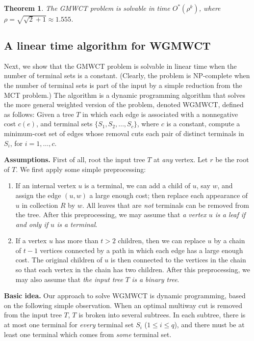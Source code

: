 \documentclass[11pt]{article}
\newtheorem{theorem}{Theorem}[section]
\begin{document}
\begin{theorem}
\label{thm:gmwct}
The GMWCT problem is solvable in time $O^{*}(\rho^k)$, where $\rho = \sqrt{\sqrt{2} + 1} \approx 1.555$.
\end{theorem}




\subsection{A linear time algorithm for WGMWCT}
\label{subsec:wgmwc}
Next, we show that the GMWCT problem is solvable in linear time when the number of terminal sets is a constant. (Clearly, the problem is NP-complete when the number of terminal sets is part of the input by a simple reduction from the MCT problem.) The algorithm is a dynamic programming algorithm that solves the more general weighted version of the problem, denoted WGMWCT, defined as follows: Given a tree $T$ in which each edge is associated with a nonnegative cost $c(e)$, and terminal sets $\{S_1, S_2, \dots, S_c\}$, where $c$ is a constant, compute a minimum-cost set of edges
whose removal cuts each pair of distinct terminals in $S_i$, for $i=1, \ldots, c$.

{\bf Assumptions.}
First of all, root the input tree $T$ at {\em any} vertex.
Let $r$ be the root of $T$. We first apply some simple preprocessing:
\begin{enumerate}
\item If an internal vertex $u$ is a terminal, we can add a child of $u$, say $w$, and assign the edge $(u, w)$ a large enough cost; then replace each appearance of $u$ in collection $R$ by $w$.
All leaves that are {\em not} terminals can be removed from the tree. After this preprocessing, we may assume that {\em a vertex $u$ is a leaf if and
only if $u$ is a terminal}.

\item If a vertex $u$ has more than $t>2$ children, then we can replace $u$ by a chain of $t-1$ vertices connected by a path in which each edge has a large enough cost. The original children of $u$ is then connected to the vertices in the chain so that each vertex in the chain has two children. After this preprocessing, we may also assume that {\em the input tree $T$ is a binary
tree}.
\end{enumerate}

{\bf Basic idea.}
Our approach to solve WGMWCT is dynamic programming, based on the following
simple observation. When an optimal multiway cut is removed from the input
tree $T$, $T$ is broken into several subtrees. In each subtree, there is
at most one terminal for {\em every} terminal set $S_i$ ($1 \leq i \leq q$), and
there must be at least one terminal which comes from {\em some} terminal set.
\end{document}
